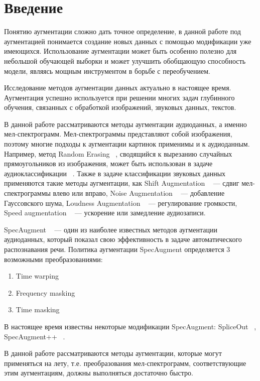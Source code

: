 \documentclass[12pt, fleqn]{article}
\begin{document}
\newpage


\section{Введение}

Понятию аугментации сложно дать точное определение, в данной работе под аугментацией понимается создание новых данных с помощью модификации уже имеющихся. Использование аугментации может быть особенно полезно для небольшой обучающей выборки и может улучшить обобщающую способность модели, являясь мощным инструментом в борьбе с переобучением. 

Исследование методов аугментации данных актуально в настоящее время. Аугментация успешно используется при решении многих задач глубинного обучения, связанных с обработкой изображений, звуковых данных, текстов.

В данной работе рассматриваются методы аугментации аудиоданных, а именно мел-спектрограмм. Мел-спектрограммы представляют собой изображения, поэтому многие подходы к аугментации картинок применимы и к аудиоданным. Например, метод Random Erasing ~\cite{RandomErasing}, сводящийся к вырезанию случайных прямоугольников из изображения, может быть использован в задаче аудиоклассификации  ~\cite{RandomErasingClassification}. Также в задаче классификации звуковых данных применяются такие методы аугментации, как Shift Augmentation ~\cite{AudioClassification} --- сдвиг мел-спектрограммы влево или вправо, Noise Augmentation ~\cite{AudioClassification} --- добавление Гауссовского шума, Loudness Augmentation ~\cite{AudioClassification} --- регулирование громкости, Speed augmentation ~\cite{AudioClassification} --- ускорение или замедление аудиозаписи.

SpecAugment ~\cite{SpecAugment} --- один из наиболее известных методов аугментации аудиоданных, который показал свою эффективность в задаче автоматического распознавания речи. Политика аугментации SpecAugment определяется 3 возможными преобразованиями: 
\begin{enumerate}
    \item Time warping ~\cite{SpecAugment}
    \item Frequency masking ~\cite{SpecAugment}
    \item Time masking ~\cite{SpecAugment}
\end{enumerate}
В настоящее время известны некоторые модификации SpecAugment: SpliceOut ~\cite{SpliceOut}, SpecAugment++ ~\cite{SpecAugment++}.

В данной работе рассматриваются методы аугментации, которые могут применяться на лету, т.е. преобразования мел-спектрограмм, соответствующие этим аугментациям, должны выполняться достаточно быстро.
\end{document}
